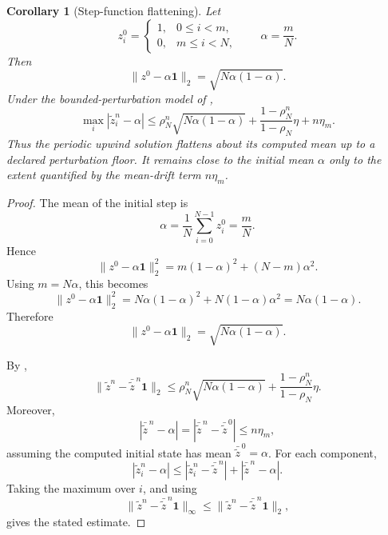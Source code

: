 \documentclass[preprint,12pt]{elsarticle}
\theoremstyle{plain}
\newtheorem{corollary}{Corollary}
\theoremstyle{remark}
\theoremstyle{definition}
\begin{document}
\begin{corollary}[Step-function flattening]
Let
\[
  z_i^0 =
  \begin{cases}
  1, & 0\le i<m,\\
  0, & m\le i<N,
  \end{cases}
  \qquad
  \alpha=\frac{m}{N}.
\]
Then
\[
  \|z^0-\alpha\mathbf 1\|_2
  =
  \sqrt{N\alpha(1-\alpha)}.
\]
Under the bounded-perturbation model of ,
\[
  \max_i|\tilde z_i^n-\alpha|
  \le
  \rho_N^n\sqrt{N\alpha(1-\alpha)}
  +
  \frac{1-\rho_N^n}{1-\rho_N}\eta
  +
  n\eta_m .
\]
Thus the periodic upwind solution flattens about its computed mean up to a
declared perturbation floor.  It remains close to the initial mean \(\alpha\)
only to the extent quantified by the mean-drift term \(n\eta_m\).
\end{corollary}

\begin{proof}
The mean of the initial step is
\[
  \alpha=\frac1N\sum_{i=0}^{N-1}z_i^0=\frac{m}{N}.
\]
Hence
\[
  \|z^0-\alpha\mathbf 1\|_2^2
  =
  m(1-\alpha)^2+(N-m)\alpha^2.
\]
Using \(m=N\alpha\), this becomes
\[
  \|z^0-\alpha\mathbf 1\|_2^2
  =
  N\alpha(1-\alpha)^2+N(1-\alpha)\alpha^2
  =
  N\alpha(1-\alpha).
\]
Therefore
\[
  \|z^0-\alpha\mathbf 1\|_2
  =
  \sqrt{N\alpha(1-\alpha)}.
\]

By ,
\[
  \|\tilde z^n-\bar{\tilde z}^{\,n}\mathbf 1\|_2
  \le
  \rho_N^n\sqrt{N\alpha(1-\alpha)}
  +
  \frac{1-\rho_N^n}{1-\rho_N}\eta .
\]
Moreover,
\[
  |\bar{\tilde z}^{\,n}-\alpha|
  =
  |\bar{\tilde z}^{\,n}-\bar{\tilde z}^{\,0}|
  \le
  n\eta_m,
\]
assuming the computed initial state has mean \(\bar{\tilde z}^{\,0}=\alpha\).
For each component,
\[
  |\tilde z_i^n-\alpha|
  \le
  |\tilde z_i^n-\bar{\tilde z}^{\,n}|
  +
  |\bar{\tilde z}^{\,n}-\alpha|.
\]
Taking the maximum over \(i\), and using
\[
  \|\tilde z^n-\bar{\tilde z}^{\,n}\mathbf 1\|_\infty
  \le
  \|\tilde z^n-\bar{\tilde z}^{\,n}\mathbf 1\|_2,
\]
gives the stated estimate.
\end{proof}
\end{document}
